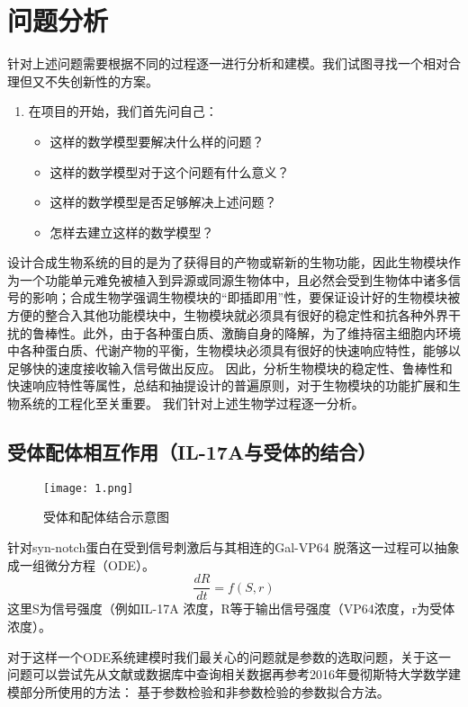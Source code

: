 \documentclass[withoutpreface,bwprint]{cumcmthesis} %
\begin{document}
\section{问题分析}
针对上述问题需要根据不同的过程逐一进行分析和建模。我们试图寻找一个相对合理但又不失创新性的方案。

\begin{enumerate}[itemindent=2em]
	\item 在项目的开始，我们首先问自己：
	\begin{itemize}[itemindent=1em]
		\item 这样的数学模型要解决什么样的问题？
		\item 这样的数学模型对于这个问题有什么意义？
		\item 这样的数学模型是否足够解决上述问题？
		\item 怎样去建立这样的数学模型？
	\end{itemize}
\end{enumerate}

设计合成生物系统的目的是为了获得目的产物或崭新的生物功能，因此生物模块作为一个功能单元难免被植入到异源或同源生物体中，且必然会受到生物体中诸多信号的影响；合成生物学强调生物模块的“即插即用”性，要保证设计好的生物模块被方便的整合入其他功能模块中，生物模块就必须具有很好的稳定性和抗各种外界干扰的鲁棒性。此外，由于各种蛋白质、激酶自身的降解，为了维持宿主细胞内环境中各种蛋白质、代谢产物的平衡，生物模块必须具有很好的快速响应特性，能够以足够快的速度接收输入信号做出反应。
因此，分析生物模块的稳定性、鲁棒性和快速响应特性等属性，总结和抽提设计的普遍原则，对于生物模块的功能扩展和生物系统的工程化至关重要。
我们针对上述生物学过程逐一分析。
\subsection{受体配体相互作用（IL-17A与受体的结合）}
\begin{figure}[!h]
	\centering
	\texttt{[image: 1.png]}
	\caption{受体和配体结合示意图}
\end{figure}

针对syn-notch蛋白在受到信号刺激后与其相连的Gal-VP64 脱落这一过程可以抽象成一组微分方程（ODE）。
$$\frac{dR}{dt} = f(S,r)$$   
这里S为信号强度（例如IL-17A 浓度，R等于输出信号强度（VP64浓度，r为受体浓度）。

对于这样一个ODE系统建模时我们最关心的问题就是参数的选取问题，关于这一问题可以尝试先从文献或数据库中查询相关数据再参考2016年曼彻斯特大学数学建模部分所使用的方法：
基于参数检验和非参数检验的参数拟合方法。
\end{document}
